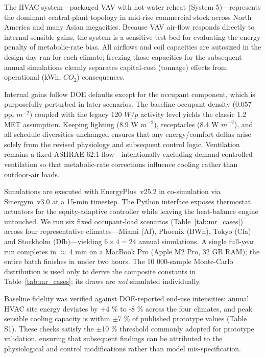 The HVAC system—packaged VAV with hot-water reheat (System 5)—represents the dominant central‐plant topology in mid-rise commercial stock across North America and many Asian megacities. Because VAV air-flow responds directly to internal sensible gains, the system is a sensitive test-bed for evaluating the energy penalty of metabolic-rate bias. All airflows and coil capacities are autosized in the design-day run for each climate; freezing those capacities for the subsequent annual simulations cleanly separates capital-cost (tonnage) effects from operational (kWh, $CO_2$) consequences.

Internal gains follow DOE defaults except for the occupant component, which is purposefully perturbed in later scenarios. The baseline occupant density (0.057 ppl $m^{-2}$) coupled with the legacy 120 $W/p$ activity level yields the classic 1.2 MET assumption. Keeping lighting (8.9 W $m^{-2}$), receptacles (8.4 W $m^{-2}$), and all schedule diversities unchanged ensures that any energy/comfort deltas arise solely from the revised physiology and subsequent control logic. Ventilation remains a fixed ASHRAE 62.1 flow—intentionally excluding demand-controlled ventilation so that metabolic-rate corrections influence cooling rather than outdoor-air loads.

Simulations are executed with EnergyPlus~v25.2 in co-simulation via
Sinergym~v3.0 at a 15-min timestep.
The Python interface exposes thermostat actuators for the
equity-adaptive controller while leaving the heat-balance engine untouched.
We run six fixed occupant-load scenarios (Table~\ref{tab:mr_cases}) across
four representative climates—Miami (Af), Phoenix (BWh), Tokyo (Cfa)
and Stockholm (Dfb)—yielding
$6 \times 4 = 24$ annual simulations.
A single full-year run completes in $\approx$\,4 min on a MacBook Pro
(Apple M2 Pro, 32 GB RAM); the entire batch finishes in under two hours.
The 10 000-sample Monte-Carlo distribution is used only to derive the
composite constants in Table~\ref{tab:mr_cases}; its draws are \emph{not}
simulated individually.

Baseline fidelity was verified against DOE-reported end-use intensities: annual HVAC site energy deviates by +4 \% to -8 \% across the four climates, and peak sensible cooling capacity is within $\pm$7 \% of published prototype values (Table S1). These checks satisfy the $\pm$10 \% threshold commonly adopted for prototype validation, ensuring that subsequent findings can be attributed to the physiological and control modifications rather than model mis-specification.


